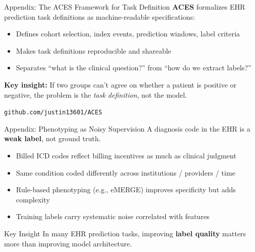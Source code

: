\documentclass[aspectratio=169,10pt]{beamer}
\begin{document}
\begin{frame}{Appendix: The ACES Framework for Task Definition}
\textbf{ACES} formalizes EHR prediction task definitions as machine-readable specifications:
\begin{itemize}
    \item Defines cohort selection, index events, prediction windows, label criteria
    \item Makes task definitions reproducible and shareable
    \item Separates ``what is the clinical question?'' from ``how do we extract labels?''
\end{itemize}
\vspace{0.2em}
\textbf{Key insight:} If two groups can't agree on whether a patient is positive or negative, the problem is the \emph{task definition}, not the model.

{\small\color{columbia}\texttt{github.com/justin13601/ACES}}
\end{frame}

\begin{frame}{Appendix: Phenotyping as Noisy Supervision}
A diagnosis code in the EHR is a \textbf{weak label}, not ground truth.
\begin{itemize}
    \item Billed ICD codes reflect billing incentives as much as clinical judgment
    \item Same condition coded differently across institutions / providers / time
    \item Rule-based phenotyping (e.g., eMERGE) improves specificity but adds complexity
    \item Training labels carry systematic noise correlated with features
\end{itemize}
\vspace{0.2em}
\begin{block}{Key Insight}
In many EHR prediction tasks, improving \textbf{label quality} matters more than improving model architecture.
\end{block}
\end{frame}
\end{document}
